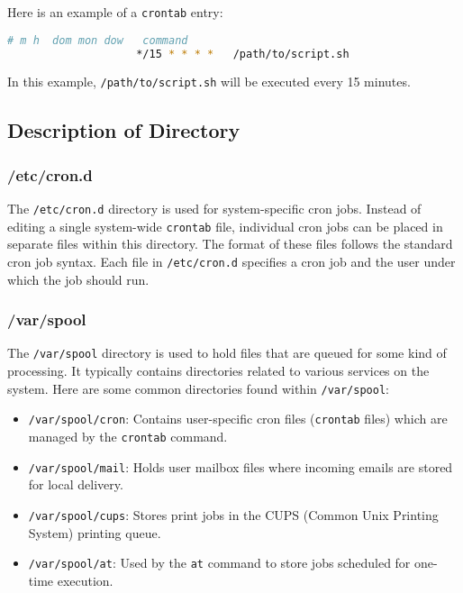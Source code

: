 \documentclass{article}
\begin{document}
                Here is an example of a \texttt{crontab} entry:
                    \begin{lstlisting}[language=bash]
                    # m h  dom mon dow   command
                    */15 * * * *   /path/to/script.sh
                    \end{lstlisting}
                    In this example, \texttt{/path/to/script.sh} will be executed every 15 minutes.

        \subsection{Description of Directory}
            \subsubsection{/etc/cron.d}
                The \texttt{/etc/cron.d} directory is used for system-specific cron jobs. Instead of editing a single system-wide \texttt{crontab} file, individual cron jobs can be placed in separate files within this directory. The format of these files follows the standard cron job syntax. Each file in \texttt{/etc/cron.d} specifies a cron job and the user under which the job should run.

            \subsubsection{/var/spool}        
                The \texttt{/var/spool} directory is used to hold files that are queued for some kind of processing. It typically contains directories related to various services on the system. Here are some common directories found within \texttt{/var/spool}:

                \begin{itemize}
                    \item \texttt{/var/spool/cron}: Contains user-specific cron files (\texttt{crontab} files) which are managed by the \texttt{crontab} command.
                    \item \texttt{/var/spool/mail}: Holds user mailbox files where incoming emails are stored for local delivery.
                    \item \texttt{/var/spool/cups}: Stores print jobs in the CUPS (Common Unix Printing System) printing queue.
                    \item \texttt{/var/spool/at}: Used by the \texttt{at} command to store jobs scheduled for one-time execution.
                \end{itemize}
\end{document}
